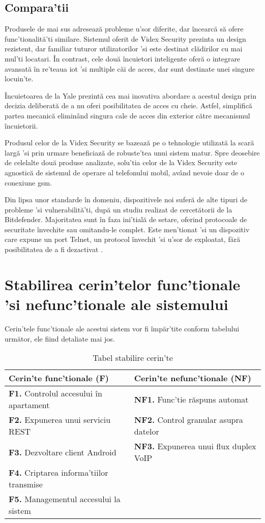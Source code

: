 \subsection {Compara'tii}

Produsele de mai sus adresează probleme u'sor diferite, dar încearcă să ofere func'tionalită'ti similare. Sistemul oferit de Videx Security prezinta un design rezistent, dar familiar tuturor utilizatorilor 'si este destinat clădirilor cu mai mul'ti locatari. În contrast, cele două încuietori inteligente oferă o integrare avansată în re'teaua \acrshort{iot} 'si multiple căi de acces, dar sunt destinate unei singure locuin'te.

Încuietoarea de la Yale prezintă cea mai inovativa abordare a acestul design prin decizia deliberată de a nu oferi posibilitatea de acces cu cheie. Astfel, simplifică partea mecanică eliminând singura cale de acces din exterior către mecanismul încuietorii.

Produsul celor de la Videx Security se bazează pe o tehnologie utilizată la scară largă 'si prin urmare beneficiază de robuste'tea unui sistem matur. Spre deosebire de celelalte două produse analizate, solu'tia celor de la Videx Security este agnostică de sistemul de operare al telefonului mobil, având nevoie doar de o conexiune \acrshort{gsm}.

Din lipsa unor standarde în domeniu, dispozitivele noi suferă de alte tipuri de probleme 'si vulnerabilită'ti, după un studiu realizat de cercetătorii de la Bitdefender. Majoritatea sunt în faza ini'tială de setare, oferind protocoale de securitate învechite sau omitandu-le complet. Este men'tionat 'si un dispozitiv care expune un port Telnet, un protocol învechit 'si u'sor de exploatat, fără posibilitatea de a fi dezactivat \cite{Bitdefender2016IoT}.

\section {Stabilirea cerin'telor func'tionale 'si nefunc'tionale ale sistemului}

Cerin'tele func'tionale ale acestui sistem vor fi împăr'tite conform tabelului următor, ele fiind detaliate mai jos.

\begin{table}[ht!]
\begin{tabular}{l|l}
\hline
Cerin'te func'tionale (F) & Cerin'te nefunc'tionale (NF) \\
\hline
\hline
\textbf{F1.} Controlul accesului în apartament & \textbf{NF1.} Func'tie răspuns automat \\
\hline
\textbf{F2.} Expunerea unui serviciu REST & \textbf{NF2.} Control granular asupra datelor \\
\hline
\textbf{F3.} Dezvoltare client Android & \textbf{NF3.} Expunerea unui flux duplex VoIP \\
\hline
\textbf{F4.} Criptarea informa'tiilor transmise & \\
\hline
\textbf{F5.} Managementul accesului la sistem & \\
\hline
\end{tabular}
\centering
\caption{Tabel stabilire cerin'te}
\label{tab:funcnefunc}
\end{table}

